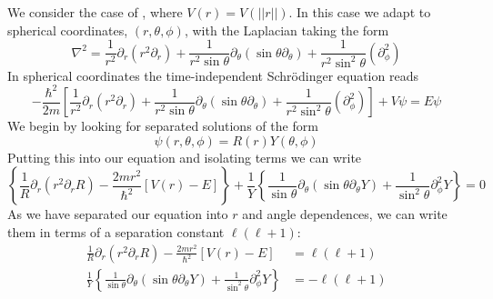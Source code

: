 \documentclass[12pt, a4paper, oneside, openright, titlepage]{book}
\newcommand{\norm}[1]{\left|\left|#1\right|\right|}
\begin{document}
We consider the case of , where $V(r) = V(\norm{r})$. In this case we adapt to spherical coordinates, $(r,\theta,\phi)$, with the Laplacian taking the form \begin{equation*}
    \nabla^2 = \frac{1}{r^2}\partial_r\left(r^2\partial_r\right) + \frac{1}{r^2\sin\theta}\partial_{\theta}\left(\sin\theta\partial_{\theta}\right) + \frac{1}{r^2\sin^2\theta}\left(\partial_{\phi}^2\right)
\end{equation*}
In spherical coordinates the time-independent Schr\"{o}dinger equation reads \begin{equation*}
    -\frac{\hbar^2}{2m}\left[\frac{1}{r^2}\partial_r\left(r^2\partial_r\right) + \frac{1}{r^2\sin\theta}\partial_{\theta}\left(\sin\theta\partial_{\theta}\right) + \frac{1}{r^2\sin^2\theta}\left(\partial_{\phi}^2\right)\right] + V\psi = E\psi
\end{equation*}
We begin by looking for separated solutions of the form \begin{equation*}
    \psi(r,\theta,\phi) = R(r)Y(\theta,\phi)
\end{equation*}
Putting this into our equation and isolating terms we can write \begin{equation*}
    \left\{\frac{1}{R}\partial_r(r^2\partial_rR)-\frac{2mr^2}{\hbar^2}[V(r)-E]\right\} + \frac{1}{Y}\left\{\frac{1}{\sin\theta}\partial_{\theta}(\sin\theta\partial_{\theta}Y) + \frac{1}{\sin^2\theta}\partial_{\phi}^2Y\right\} = 0
\end{equation*}
As we have separated our equation into $r$ and angle dependences, we can write them in terms of a separation constant $\ell(\ell+1)$: \begin{align*}
    \frac{1}{R}\partial_r(r^2\partial_rR)-\frac{2mr^2}{\hbar^2}[V(r)-E] &= \ell(\ell+1) \\
    \frac{1}{Y}\left\{\frac{1}{\sin\theta}\partial_{\theta}(\sin\theta\partial_{\theta}Y) + \frac{1}{\sin^2\theta}\partial_{\phi}^2Y\right\} &= -\ell(\ell+1)
\end{align*}
\end{document}

